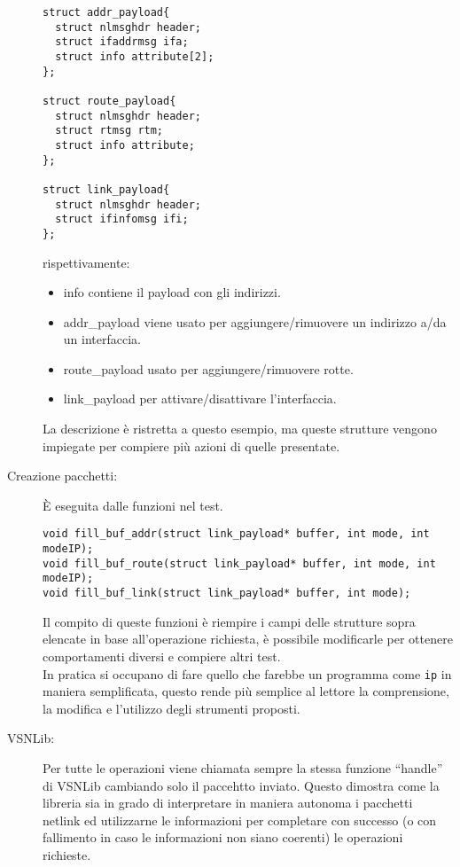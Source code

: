 \begin{description}
\begin{lstlisting}[style=CStyle]
  struct addr_payload{
  struct nlmsghdr header;
  struct ifaddrmsg ifa;
  struct info attribute[2];
};

struct route_payload{
  struct nlmsghdr header;
  struct rtmsg rtm;
  struct info attribute;
};

struct link_payload{
  struct nlmsghdr header;
  struct ifinfomsg ifi;
};

\end{lstlisting}
rispettivamente:
\begin{itemize}
  \item info contiene il payload con gli indirizzi.
  \item addr\_payload viene usato per aggiungere/rimuovere un indirizzo a/da un interfaccia.
  \item route\_payload usato per aggiungere/rimuovere rotte.
  \item link\_payload per attivare/disattivare l'interfaccia.
\end{itemize}
La descrizione \`e ristretta a questo esempio, ma queste strutture vengono impiegate per compiere pi\`u azioni di quelle presentate.
\item[Creazione pacchetti: ]\`E eseguita dalle funzioni nel test.
\begin{lstlisting}[style=CStyle]
void fill_buf_addr(struct link_payload* buffer, int mode, int modeIP);
void fill_buf_route(struct link_payload* buffer, int mode, int modeIP);
void fill_buf_link(struct link_payload* buffer, int mode);
\end{lstlisting}
Il compito di queste funzioni \`e riempire i campi delle strutture sopra elencate in base all'operazione richiesta, \`e possibile modificarle per ottenere comportamenti diversi e compiere altri test.\\
In pratica si occupano di fare quello che farebbe un programma come \texttt{ip} in maniera semplificata, questo rende pi\`u semplice al lettore la comprensione, la modifica e l'utilizzo degli strumenti proposti.
\item[VSNLib: ]Per tutte le operazioni viene chiamata sempre la stessa funzione ``handle'' di VSNLib cambiando solo il paccehtto inviato. Questo dimostra come la libreria sia in grado di interpretare in maniera autonoma i pacchetti netlink ed utilizzarne le informazioni per completare con successo (o con fallimento in caso le informazioni non siano coerenti) le operazioni richieste.
\end{description}
